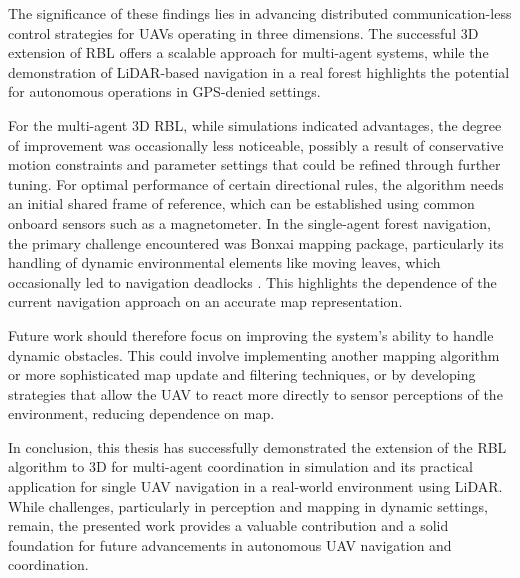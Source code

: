 The significance of these findings lies in advancing distributed communication-less control strategies for \ac{UAV}s operating in three dimensions. 
The successful 3D extension of \ac{RBL} offers a scalable approach for multi-agent systems, while the demonstration of \ac{LiDAR}-based navigation in a real forest highlights the potential for autonomous operations in GPS-denied settings. 

For the multi-agent 3D \ac{RBL}, while simulations indicated advantages, the degree of improvement was occasionally less noticeable, possibly a result of conservative motion constraints and parameter settings that could be refined through further tuning.
For optimal performance of certain directional rules, the algorithm needs an initial shared frame of reference, which can be established using common onboard sensors such as a magnetometer.
In the single-agent forest navigation, the primary challenge encountered was Bonxai mapping package, particularly its handling of dynamic environmental elements like moving leaves, which occasionally led to navigation deadlocks \cite{flight_fail}. 
This highlights the dependence of the current navigation approach on an accurate map representation.

Future work should therefore focus on improving the system's ability to handle dynamic obstacles. 
This could involve implementing another mapping algorithm or more sophisticated map update and filtering techniques, or by developing strategies that allow the UAV to react more directly to sensor perceptions of the environment, reducing dependence on map.

In conclusion, this thesis has successfully demonstrated the extension of the \ac{RBL} algorithm to 3D for multi-agent coordination in simulation and its practical application for single \ac{UAV} navigation in a real-world environment using \ac{LiDAR}. 
While challenges, particularly in perception and mapping in dynamic settings, remain, the presented work provides a valuable contribution and a solid foundation for future advancements in autonomous \ac{UAV} navigation and coordination.
